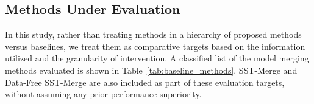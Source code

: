 \documentclass{article}
\begin{document}
\subsection{Methods Under Evaluation}


In this study, rather than treating methods in a hierarchy of proposed methods versus baselines, we treat them as comparative targets based on the information utilized and the granularity of intervention. A classified list of the model merging methods evaluated is shown in Table~\ref{tab:baseline_methods}. SST-Merge and Data-Free SST-Merge are also included as part of these evaluation targets, without assuming any prior performance superiority.
\end{document}
